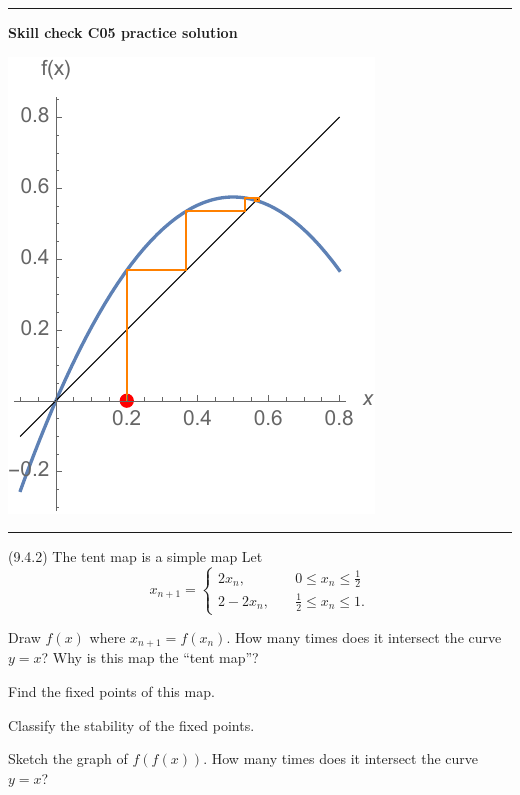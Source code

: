 \documentclass[12pt,letterpaper,noanswers]{exam}
\begin{document}
\vspace{0.2cm}
\hrule
\vspace{0.2cm}
\noindent\textbf{Skill check C05 practice solution} 

\includegraphics{img/C04-C05cobwebsoln.pdf}

\vspace{0.2cm}

\hrule
\vspace{0.2cm}
\eject

\begin{questions}
\question (9.4.2) The tent map is a simple map
Let \[
x_{n+1} = \left\{
        \begin{array}{ll}
            2x_n, & \quad 0\leq x_n \leq \frac{1}{2} \\
            2-2x_n, & \quad \frac{1}{2}\leq x_n \leq 1.
        \end{array}
    \right.
    \]
    \begin{parts}
    \item Draw $f(x)$ where $x_{n+1} = f(x_n)$.  How many times does it intersect the curve $y=x$?  Why is this map the ``tent map''?
    \item Find the fixed points of this map.
    \item Classify the stability of the fixed points.
    \item Sketch the graph of $f(f(x))$.  How many times does it intersect the curve $y = x$?
    \end{parts}
\end{questions}
\end{document}
